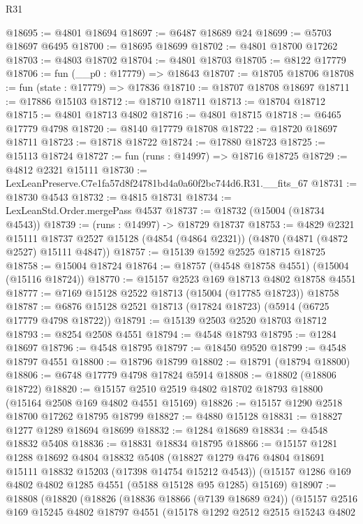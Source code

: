 \begin{lexlean}{R31}
\begin{coremodule}
@18695 := @4801 @18694
@18697 := @6487 @18689 @24
@18699 := @5703 @18697 @6495
@18700 := @18695 @18699
@18702 := @4801 @18700 @17262
@18703 := @4803 @18702
@18704 := @4801 @18703
@18705 := @8122 @17779
@18706 := fun (__p0 : @17779) => @18643
@18707 := @18705 @18706
@18708 := fun (state : @17779) => @17836
@18710 := @18707 @18708 @18697
@18711 := @17886 @15103
@18712 := @18710 @18711
@18713 := @18704 @18712
@18715 := @4801 @18713 @4802
@18716 := @4801 @18715
@18718 := @6465 @17779 @4798
@18720 := @8140 @17779 @18708
@18722 := @18720 @18697 @18711
@18723 := @18718 @18722
@18724 := @17880 @18723
@18725 := @15113 @18724
@18727 := fun (runs : @14997) => @18716 @18725
@18729 := @4812 @2321 @15111
@18730 := LexLeanPreserve.C7e1fa57d8f24781bd4a0a60f2bc744d6.R31.__fits_67
@18731 := @18730 @4543
@18732 := @4815 @18731
@18734 := LexLeanStd.Order.mergePass @4537
@18737 := @18732 (@15004 (@18734 @4543))
@18739 := (runs : @14997) -> @18729 @18737
@18753 := @4829
    @2321
    @15111
    @18737
    @2527
    @15128
    (@4854 (@4864 @2321))
    (@4870 (@4871 (@4872 @2527) @15111 @4847))
@18757 := @15139 @1592 @2525 @18715 @18725
@18758 := @15004 @18724
@18764 := @18757 (@4548 @18758 @4551) (@15004 (@15116 @18724))
@18770 := @15157 @2523 @169 @18713 @4802 @18758 @4551
@18777 := @7169 @15128 @2522 @18713 (@15004 (@17785 @18723)) @18758
@18787 := @6876 @15128 @2521 @18713 (@17824 @18723) (@5914 (@6725 @17779 @4798 @18722))
@18791 := @15139 @2503 @2520 @18703 @18712
@18793 := @8254 @2508 @4551
@18794 := @4548 @18793
@18795 := @1284 @18697
@18796 := @4548 @18795
@18797 := @18450 @9520
@18799 := @4548 @18797 @4551
@18800 := @18796 @18799
@18802 := @18791 (@18794 @18800)
@18806 := @6748 @17779 @4798 @17824 @5914
@18808 := @18802 (@18806 @18722)
@18820 := @15157 @2510 @2519 @4802 @18702 @18793 @18800 (@15164 @2508 @169 @4802 @4551 @15169)
@18826 := @15157 @1290 @2518 @18700 @17262 @18795 @18799
@18827 := @4880 @15128
@18831 := @18827 @1277 @1289 @18694 @18699
@18832 := @1284 @18689
@18834 := @4548 @18832 @5408
@18836 := @18831 @18834 @18795
@18866 := @15157
    @1281
    @1288
    @18692
    @4804
    @18832
    @5408
    (@18827 @1279 @476 @4804 @18691 @15111 @18832 @15203 (@17398 @14754 @15212 @4543))
    (@15157 @1286 @169 @4802 @4802 @1285 @4551 (@5188 @15128 @95 @1285) @15169)
@18907 := @18808
    (@18820
      (@18826
        (@18836 @18866 (@7139 @18689 @24))
        (@15157
          @2516
          @169
          @15245
          @4802
          @18797
          @4551
          (@15178
            @1292
            @2512
            @2515
            @15243
            @4802

\end{coremodule}
\end{lexlean}
